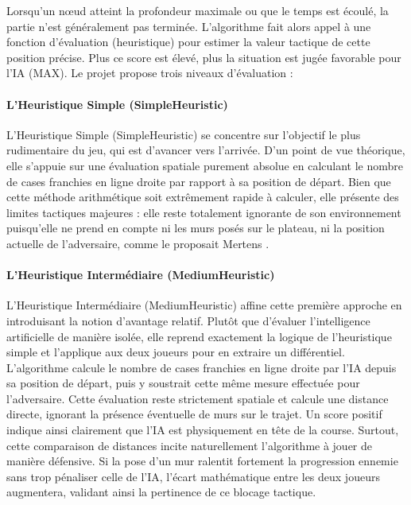 \documentclass[a4paper]{article}
\begin{document}
Lorsqu'un nœud atteint la profondeur maximale ou que le temps est écoulé, la partie n'est généralement pas terminée. L'algorithme fait alors appel à une fonction d'évaluation (heuristique) pour estimer la valeur tactique de cette position précise. Plus ce score est élevé, plus la situation est jugée favorable pour l'IA (MAX). Le projet propose trois niveaux d'évaluation :

\paragraph{L'Heuristique Simple (SimpleHeuristic)}

L'Heuristique Simple (SimpleHeuristic) se concentre sur l'objectif le plus rudimentaire du jeu, qui est d’avancer vers l'arrivée. D'un point de vue théorique, elle s'appuie sur une évaluation spatiale purement absolue en calculant le nombre de cases franchies en ligne droite par rapport à sa position de départ. Bien que cette méthode arithmétique soit extrêmement rapide à calculer, elle présente des limites tactiques majeures : elle reste totalement ignorante de son environnement puisqu'elle ne prend en compte ni les murs posés sur le plateau, ni la position actuelle de l'adversaire, comme le proposait Mertens \cite{mertens2006}.

\paragraph{L'Heuristique Intermédiaire (MediumHeuristic)}

L'Heuristique Intermédiaire (MediumHeuristic) affine cette première approche en introduisant la notion d'avantage relatif. Plutôt que d'évaluer l'intelligence artificielle de manière isolée, elle reprend exactement la logique de l'heuristique simple et l'applique aux deux joueurs pour en extraire un différentiel. L'algorithme calcule le nombre de cases franchies en ligne droite par l'IA depuis sa position de départ, puis y soustrait cette même mesure effectuée pour l'adversaire. Cette évaluation reste strictement spatiale et calcule une distance directe, ignorant la présence éventuelle de murs sur le trajet. Un score positif indique ainsi clairement que l'IA est physiquement en tête de la course. Surtout, cette comparaison de distances incite naturellement l'algorithme à jouer de manière défensive. Si la pose d'un mur ralentit fortement la progression ennemie sans trop pénaliser celle de l'IA, l'écart mathématique entre les deux joueurs augmentera, validant ainsi la pertinence de ce blocage tactique.
\end{document}
